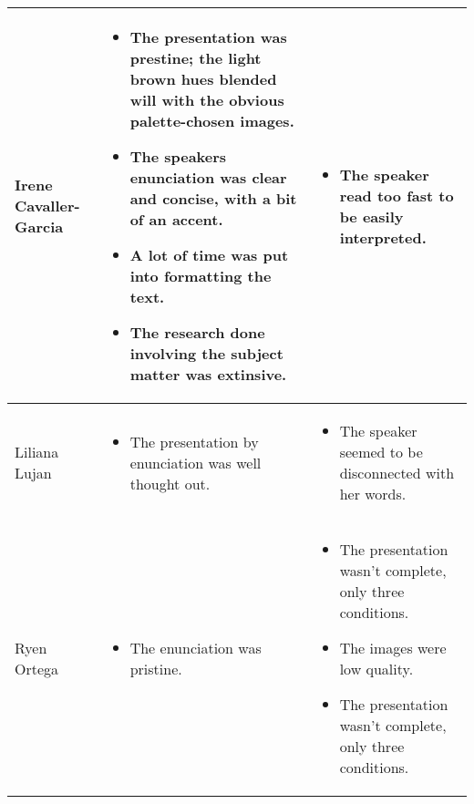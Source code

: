 \documentclass{article}
\begin{document}
\begin{center}
\begin{longtable}[c]{|m{1.9in}|m{1.9in}|m{1.9in}|}
        Irene Cavaller-Garcia
        &
        \begin{itemize}
            \item{The presentation was prestine; the light brown hues blended will with the obvious palette-chosen images.}
            \item{The speakers enunciation was clear and concise, with a bit of an accent.}
            \item{A lot of time was put into formatting the text.}
            \item{The research done involving the subject matter was extinsive.}
        \end{itemize}
        &
        \begin{itemize}
            \item{The speaker read too fast to be easily interpreted.}
        \end{itemize}
        \\
        \hline

        Liliana Lujan
        &
        \begin{itemize}
            \item{The presentation by enunciation was well thought out.}
        \end{itemize}
        &
        \begin{itemize}
            \item{The speaker seemed to be disconnected with her words.}
        \end{itemize}
        \\
        \hline

        Ryen Ortega
        &
        \begin{itemize}
            \item{The enunciation was pristine.}
        \end{itemize}
        &
        \begin{itemize}
            \item{The presentation wasn't complete, only three conditions.}
            \item{The images were low quality.}
            \item{The presentation wasn't complete, only three conditions.}
        \end{itemize}
        \\

        \hline


\end{longtable}
\end{center}
\end{document}
